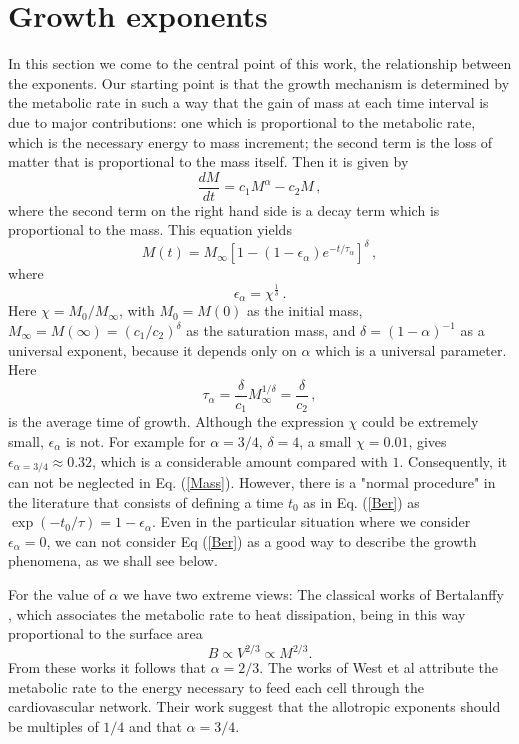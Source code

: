 \documentclass[12pt]{iopart}
\begin{document}
\section{Growth exponents}
In this section we come to the central point of this work, the relationship between the exponents.
Our starting point is that the growth mechanism is determined by the metabolic rate in such a way that the gain of mass at each time interval is due to major contributions: one which is proportional to the metabolic rate, which is the necessary energy to mass increment; the second term is the loss of matter that is proportional to the mass itself. Then it is given by
 \begin{equation}
\frac{dM}{dt} =c_1 M^{\alpha}-c_2 M\,,
\label{dM}
\end{equation}
where the second term on the right hand side  is a decay term which is proportional to the mass.
 This equation yields
\begin{equation}
M(t) = M_\infty \left[ 1 -(1-\epsilon_{\alpha}) e^{-t/\tau_\alpha} \right]^\delta\,,
\label{Mass}
\end{equation}
where
\begin{equation}
\epsilon_{\alpha} =  \chi^{\frac{1}{\delta}}\,.
\label{epsilon}
\end{equation}
Here $\chi=M_0/M_\infty$, with $M_0=M(0)$ as the initial mass, $M_\infty = M(\infty)=(c_1/c_2)^\delta$ as the saturation mass, and  $\delta = (1-\alpha)^{-1}$ as a universal exponent, because it depends only on $\alpha$ which is a universal parameter. Here
\begin{equation}
\label{tau}
\tau_{\alpha} =  \frac{\delta}{ c_1} M_\infty^{1/\delta}= \frac{\delta}{c_2}\,,
\end{equation}
is the average time of growth.   Although the expression $\chi$ could be extremely small,
$\epsilon_\alpha$ is not. For example for $\alpha=3/4$, $\delta=4$, a small $ \chi=0.01$, gives $\epsilon_{\alpha=3/4} \approx 0.32$,  which is a considerable amount compared with $1$. Consequently, it can not be neglected in Eq. (\ref{Mass}). However, there is  a "normal procedure" in the literature that consists of defining a time $t_0$ as in Eq. (\ref{Ber}) as $\exp(-t_0/\tau)=1-\epsilon_\alpha$. Even in the particular situation where we  consider $\epsilon_{\alpha}=0$, we can not consider  Eq (\ref{Ber}) as a good way to describe the growth phenomena, as we shall see below.

For the value of $\alpha$ we have two extreme views: The classical works of  Bertalanffy  \cite{Bertalanffy38a,Bertalanffy57}, which associates the metabolic rate to heat dissipation, being in this way proportional to the surface area
\begin{equation}
B \propto V^{2/3} \propto M^{2/3}.
\end{equation}
From these works it follows that $\alpha=2/3$. The works of West et al \cite{West97,West99,Brown05} attribute the metabolic rate to the energy necessary to feed each cell through the cardiovascular network. Their work suggest that the allotropic exponents should be multiples of $1/4$ and that $\alpha=3/4$. 
\end{document}
